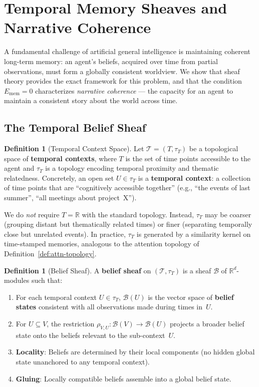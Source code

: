 \documentclass[11pt,a4paper]{article}
\theoremstyle{plain}
\theoremstyle{definition}
\newtheorem{definition}[theorem]{Definition}
\theoremstyle{remark}
\newcommand{\R}{\mathbb{R}}
\newcommand{\cT}{\mathcal{T}}
\newcommand{\cB}{\mathcal{B}}
\begin{document}
\section{Temporal Memory Sheaves and Narrative Coherence}\label{sec:memory}

A fundamental challenge of artificial general intelligence is maintaining coherent long-term memory: an agent's beliefs, acquired over time from partial observations, must form a globally consistent worldview. We show that sheaf theory provides the exact framework for this problem, and that the condition $E_{\mathrm{mem}} = 0$ characterizes \emph{narrative coherence} --- the capacity for an agent to maintain a consistent story about the world across time.

\subsection{The Temporal Belief Sheaf}

\begin{definition}[Temporal Context Space]\label{def:temporal-space}
Let $\cT = (T, \tau_T)$ be a topological space of \textbf{temporal contexts}, where $T$ is the set of time points accessible to the agent and $\tau_T$ is a topology encoding temporal proximity and thematic relatedness. Concretely, an open set $U \in \tau_T$ is a \textbf{temporal context}: a collection of time points that are ``cognitively accessible together'' (e.g., ``the events of last summer'', ``all meetings about project~X'').

We do \emph{not} require $T = \R$ with the standard topology. Instead, $\tau_T$ may be coarser (grouping distant but thematically related times) or finer (separating temporally close but unrelated events). In practice, $\tau_T$ is generated by a similarity kernel on time-stamped memories, analogous to the attention topology of Definition~\ref{def:attn-topology}.
\end{definition}

\begin{definition}[Belief Sheaf]\label{def:belief-sheaf}
A \textbf{belief sheaf} on $(\cT, \tau_T)$ is a sheaf $\cB$ of $\R^d$-modules such that:
\begin{enumerate}[label=(\roman*),nosep]
\item For each temporal context $U \in \tau_T$, $\cB(U)$ is the vector space of \textbf{belief states} consistent with all observations made during times in~$U$.
\item For $U \subseteq V$, the restriction $\rho_{V,U}: \cB(V) \to \cB(U)$ projects a broader belief state onto the beliefs relevant to the sub-context~$U$.
\item \textbf{Locality}: Beliefs are determined by their local components (no hidden global state unanchored to any temporal context).
\item \textbf{Gluing}: Locally compatible beliefs assemble into a global belief state.
\end{enumerate}
\end{definition}
\end{document}
